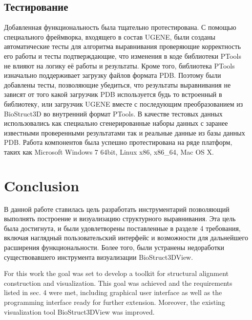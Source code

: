 \documentclass[a4paper, 12pt, titlepage, utf8]{extarticle}
\let\oldsection\section         %
\renewcommand{\section}{\newpage\oldsection}
\begin{document}
\begin{original}
\begin{original}
\begin{original}
\subsection{Тестирование}
Добавленная функциональность была тщательно протестирована. С помощью
специального фреймворка, входящего в состав UGENE, были созданы автоматические
тесты для алгоритма выравнивания проверяющие корректность его работы и тесты
подтверждающие, что изменения в коде библиотеки PTools не влияют на логику её
работы и результаты. Кроме того, библиотека PTools изначально поддерживает
загрузку файлов формата PDB. Поэтому были добавлены тесты, позволяющие
убедиться, что результаты выравнивания не зависят от того какой загрузчик PDB
используется будь то встроенный в библиотеку, или загрузчик UGENE вместе с
последующим преобразованием из BioStruct3D во внутренний формат PTools. В
качестве тестовых данных использовались как специально сгенерированные наборы
данных с заранее известными проверенными результатами так и реальные данные из
базы данных PDB. Работа компонентов была успешно протестирована на ряде
платформ, таких как Microsoft Windows 7 64bit, Linux x86, x86\_64, Mac OS X.
\end{original}


\section{Conclusion}
\begin{original}
В данной работе ставилась цель разработать инструментарий позволяющий выполнять
построение и визуализацию структурного выравнивания. Эта цель была достигнута, и
были удовлетворены поставленные в разделе 4 требования, включая наглядный
пользовательский интерфейс и возможности для дальнейшего расширения
функциональности. Более того, были устранены недоработки существовавшего
инструмента визуализации BioStruct3DView.
\end{original}

For this work the goal was set to develop a toolkit for structural alignment
construction and visualization. This goal was achieved and the requirements
listed in sec. 4 were met, including graphical user interface as well as the
programming interface ready for further extension. Moreover, the existing
visualization tool BioStruct3DView was improved.


\end{original}
\end{original}
\end{document}
